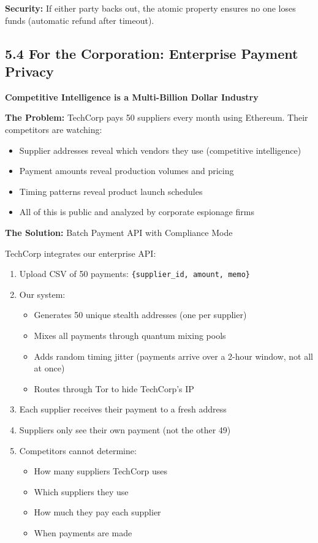 \documentclass[11pt,a4paper]{article}
\begin{document}
\textbf{Security:} If either party backs out, the atomic property ensures no one loses funds (automatic refund after timeout).

\subsection{5.4 For the Corporation: Enterprise Payment Privacy}

\textbf{Competitive Intelligence is a Multi-Billion Dollar Industry}

\textbf{The Problem:} TechCorp pays 50 suppliers every month using Ethereum. Their competitors are watching:
\begin{itemize}
    \item Supplier addresses reveal which vendors they use (competitive intelligence)
    \item Payment amounts reveal production volumes and pricing
    \item Timing patterns reveal product launch schedules
    \item All of this is public and analyzed by corporate espionage firms
\end{itemize}

\textbf{The Solution:} Batch Payment API with Compliance Mode

TechCorp integrates our enterprise API:
\begin{enumerate}
    \item Upload CSV of 50 payments: \texttt{\{supplier\_id, amount, memo\}}

    \item Our system:
    \begin{itemize}
        \item Generates 50 unique stealth addresses (one per supplier)
        \item Mixes all payments through quantum mixing pools
        \item Adds random timing jitter (payments arrive over a 2-hour window, not all at once)
        \item Routes through Tor to hide TechCorp's IP
    \end{itemize}

    \item Each supplier receives their payment to a fresh address

    \item Suppliers only see their own payment (not the other 49)

    \item Competitors cannot determine:
    \begin{itemize}
        \item How many suppliers TechCorp uses
        \item Which suppliers they use
        \item How much they pay each supplier
        \item When payments are made
    \end{itemize}
\end{enumerate}
\end{document}
